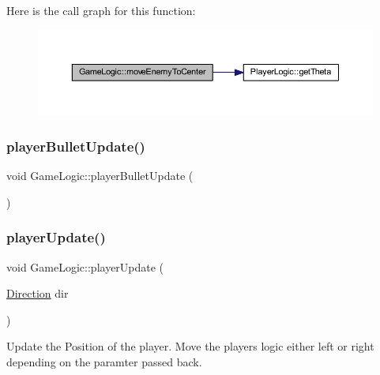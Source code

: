Here is the call graph for this function\+:\nopagebreak
\begin{figure}[H]
\begin{center}
\leavevmode
\includegraphics[width=350pt]{class_game_logic_af355faaa66630a76a14ef0d7dc5adb54_cgraph}
\end{center}
\end{figure}
\mbox{\label{class_game_logic_a2293e862afa9caa43ac1c21757b9c914}} 
\subsubsection{\texorpdfstring{player\+Bullet\+Update()}{playerBulletUpdate()}}
{\footnotesize\ttfamily void Game\+Logic\+::player\+Bullet\+Update (\begin{DoxyParamCaption}{ }\end{DoxyParamCaption})}

\mbox{\label{class_game_logic_a3bb909e55fc7c811aa0e3e6a92b881bb}} 
\subsubsection{\texorpdfstring{player\+Update()}{playerUpdate()}}
{\footnotesize\ttfamily void Game\+Logic\+::player\+Update (\begin{DoxyParamCaption}\item[{\hyperlink{_game_common_data_8h_a224b9163917ac32fc95a60d8c1eec3aa}{Direction}}]{dir }\end{DoxyParamCaption})}



Update the Position of the player. Move the players logic either left or right depending on the paramter passed back. 


